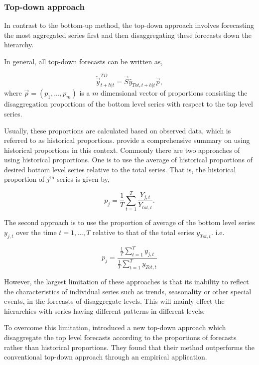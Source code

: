 \documentclass[graybox]{svmult}
\begin{document}
\subsubsection{Top-down approach}

In contrast to the bottom-up method, the top-down approach involves forecasting the most aggregated series first and then disaggregating these forecasts down the hierarchy.  

In general, all top-down forecasts can be written as, 

\begin{equation}\label{eq:04}
\breve{\vec{y}}^{TD}_{t+h|t}=\vec{S}\hat{y}_{Tot, t+h|t}\vec{p},
\end{equation}
where $\vec{p} = (p_1,...,p_m)$ is a $m$ dimensional vector of proportions consisting the disaggregation proportions of the bottom level series with respect to the top level series. 

Usually, these proportions are calculated based on observed data, which is referred to as historical proportions. \cite{gross1990} provide a comprehensive summary on using historical proportions in this context. Commonly there are two approaches of using historical proportions. One is to use the average of historical proportions of desired bottom level series relative to the total series. That is, the historical proportion of $j^{\text{th}}$ series is given by, 

\begin{equation}
p_j = \frac{1}{T} \sum_{t=1}^{T}\frac{Y_{j,t}}{Y_{tot,t}}.
\end{equation}

The second approach is to use the proportion of average of the bottom level series $y_{j,t}$ over the time $t=1,...,T$ relative to that of the total series $y_{Tot,t}$. i.e.

\begin{equation}
p_j = \frac{\frac{1}{T}\sum_{t=1}^{T}y_{j,t}}{\frac{1}{T}\sum_{t=1}^{T}y_{Tot,t}}
\end{equation}

However, the largest limitation of these approaches is that its inability to reflect the characteristics of individual series such as trends, seasonality or other special events, in the forecasts of disaggregate levels. This will mainly effect the hierarchies with series having different patterns in different levels.  

To overcome this limitation, \cite{athanasopoulos2009} introduced a new top-down approach which disaggregate the top level forecasts according to the proportions of forecasts rather than historical proportions. They found that their method outperforms the conventional top-down approach through an empirical application. 
\end{document}
